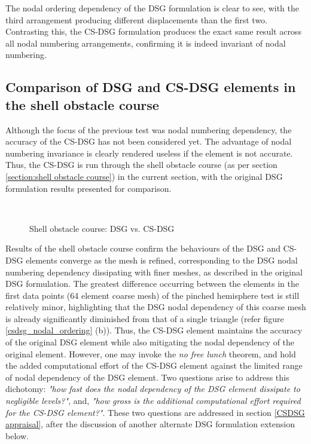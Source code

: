 The nodal ordering dependency of the DSG formulation is clear to see, with the third arrangement producing different displacements than the first two. Contrasting this, the CS-DSG formulation produces the exact same result across all nodal numbering arrangements, confirming it is indeed invariant of nodal numbering.

\subsection{Comparison of DSG and CS-DSG elements in the shell obstacle course}
Although the focus of the previous test was nodal numbering dependency, the accuracy of the CS-DSG has not been considered yet. The advantage of nodal numbering invariance is clearly rendered useless if the element is not accurate. Thus, the CS-DSG is run through the shell obstacle course (as per section \ref{section:shell obstacle course}) in the current section, with the original DSG formulation results presented for comparison.

\begin{figure}[H]
	\\
	\caption{\label{csdsg_shell_obstacl}Shell obstacle course: DSG vs. CS-DSG}
\end{figure}

Results of the shell obstacle course confirm the behaviours of the DSG and CS-DSG elements converge as the mesh is refined, corresponding to the DSG nodal numbering dependency dissipating with finer meshes, as described in the original DSG formulation. The greatest difference occurring between the elements in the first data points (64 element coarse mesh) of the pinched hemisphere test is still relatively minor, highlighting that the DSG nodal dependency of this coarse mesh is already significantly diminished from that of a single triangle (refer figure \ref{csdsg_nodal_ordering} (b)). Thus, the CS-DSG element maintains the accuracy of the original DSG element while also mitigating the nodal dependency of the original element. However, one may invoke the \textit{no free lunch} theorem, and hold the added computational effort of the CS-DSG element against the limited range of nodal dependency of the DSG element. Two questions arise to address this dichotomy: \textit{"how fast does the nodal dependency of the DSG element dissipate to negligible levels?"}, and, 
 \textit{"how gross is the additional computational effort required for the CS-DSG element?"}. These two questions are addressed in section \ref{CSDSG appraisal}, after the discussion of another alternate DSG formulation extension below.

